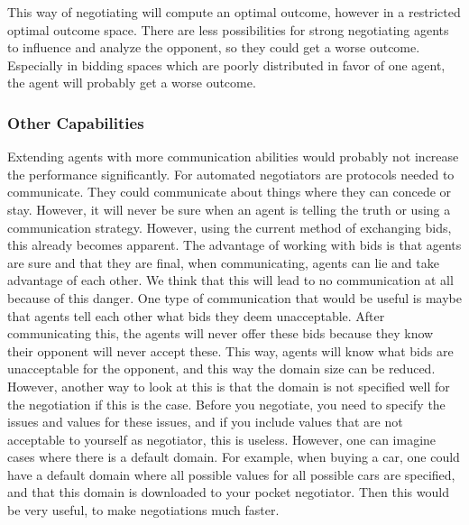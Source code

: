 This way of negotiating will compute an optimal outcome, however in a restricted optimal outcome space. There are less possibilities for strong negotiating agents to influence and analyze the opponent, so they could get a worse outcome. Especially in bidding spaces which are poorly distributed in favor of one agent, the agent will probably get a worse outcome.

\subsubsection{Other Capabilities}

Extending agents with more communication abilities would probably not increase the performance significantly. For automated negotiators are protocols needed to communicate. They could communicate about things where they can concede or stay. However, it will never be sure when an agent is telling the truth or using a communication strategy. 
However, using the current method of exchanging bids, this already becomes apparent. The advantage of working with bids is that agents are sure and that they are final,
when communicating, agents can lie and take advantage of each other. We think that this will lead to no communication at all because of this danger.
One type of communication that would be useful is maybe that agents tell each other what bids they deem unacceptable. 
After communicating this, the agents will never offer these bids because they know their opponent will never accept these. This way, 
agents will know what bids are unacceptable for the opponent, and this way the domain size can be reduced. 
However, another way to look at this is that the domain is not specified well for the negotiation if this is the case. Before you negotiate, you need to specify the issues
and values for these issues, and if you include values that are not acceptable to yourself as negotiator, this is useless. However, one can imagine cases where
there is a default domain. For example, when buying a car, one could have a default domain where all possible values for all possible cars are specified, and that this domain is 
downloaded to your pocket negotiator. Then this would be very useful, to make negotiations much faster.


